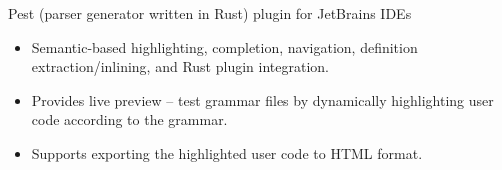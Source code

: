 \documentclass{resume}
\begin{document}


Pest (parser generator written in Rust) plugin for JetBrains IDEs
\begin{itemize}
  \item Semantic-based highlighting, completion, navigation, definition extraction/inlining, and Rust plugin integration.
  \item Provides live preview -- test grammar files by dynamically highlighting user code according to the grammar.
  \item Supports exporting the highlighted user code to HTML format.
\end{itemize}

\end{document}
